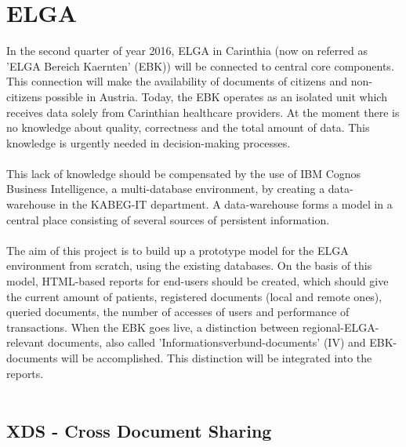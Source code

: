 \documentclass[a4paper]{article}
\begin{document}
	\newpage
		
	\section{ELGA }
	In the second quarter of year 2016, ELGA in Carinthia (now on referred as 'ELGA
	Bereich Kaernten' (EBK)) will be connected to central core components. This connection
	will make the availability of documents of citizens and 
	non-citizens possible in Austria. Today, the EBK operates
	as an isolated unit which receives data solely from Carinthian healthcare
	providers.
	At the moment there is no knowledge about quality, correctness and the total
	amount of data. This knowledge is urgently needed in decision-making processes.\\
	\\
 	This lack of knowledge should be compensated by the use of IBM Cognos Business 
 	Intelligence, a multi-database environment, by creating a data-warehouse in the KABEG-IT
 	department. A data-warehouse forms a model in a central place consisting of
 	several sources of persistent information.\\
 	\\
	The aim of this project is to build up a prototype model for the ELGA environment from 
	scratch, using the existing databases. On the basis of this model, HTML-based reports 
	for end-users should be created, which should give the current amount of
	patients, registered documents (local and remote ones), queried documents,
	the number of accesses of users and performance of transactions. When the EBK
	goes live, a distinction between regional-ELGA-relevant documents, also called 'Informationsverbund-documents' (IV)
	and EBK-documents will be accomplished. This distinction will be integrated
	into the reports.\\
	\\
	
	\subsection{XDS - Cross Document Sharing}
	
\end{document}
